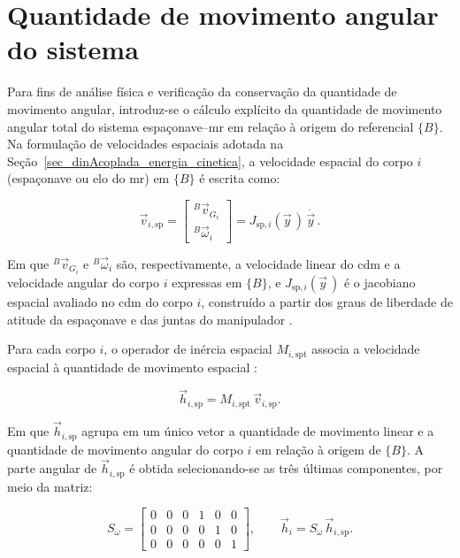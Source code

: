 \section{Quantidade de movimento angular do sistema}
\label{sec_dinAcoplada_quantidade_movimento_angular}

Para fins de análise física e verificação da conservação da quantidade de movimento angular,
introduz-se o cálculo explícito da quantidade de movimento angular total do sistema
espaçonave--\gls{mr} em relação à origem do referencial $\{B\}$.
Na formulação de velocidades espaciais adotada na Seção~\ref{sec_dinAcoplada_energia_cinetica},
a velocidade espacial do corpo $i$ (espaçonave ou elo do \gls{mr}) em $\{B\}$ é escrita como:

\begin{equation}
\vec v_{i,\text{sp}}
=
\begin{bmatrix}
{}^{B}\!\vec v_{G_i} \\[2pt]
{}^{B}\!\vec\omega_i
\end{bmatrix}
=
J_{\text{sp},i}(\vec y\,)\,\dot{\vec y\,}.
\label{eq_velocidade_espacial_corpo_i}
\end{equation}


Em que ${}^{B}\!\vec v_{G_i}$ e ${}^{B}\!\vec\omega_i$ são, respectivamente,
a velocidade linear do \gls{cdm} e a velocidade angular do corpo $i$
expressas em $\{B\}$, e $J_{\text{sp},i}(\vec y\,)$ é o jacobiano espacial
avaliado no \gls{cdm} do corpo $i$, construído a partir dos graus de
liberdade de atitude da espaçonave e das juntas do manipulador
\cite{featherstone2008}.

Para cada corpo $i$, o operador de inércia espacial
$M_{i,\text{spt}}$ associa a velocidade espacial à quantidade de movimento espacial
\cite{featherstone2008}:

\begin{equation}
\vec h_{i,\text{sp}}
=
M_{i,\text{spt}}\,\vec v_{i,\text{sp}}.
\label{eq_quantidade_movimento_espacial_corpo_i}
\end{equation}


Em que $\vec h_{i,\text{sp}}$ agrupa em um único vetor a quantidade de movimento linear e a quantidade de movimento angular do corpo $i$ em relação à origem de $\{B\}$.
A parte angular de $\vec h_{i,\text{sp}}$ é obtida selecionando-se as
três últimas componentes, por meio da matriz:

\begin{equation}
S_\omega
=
\begin{bmatrix}
0 & 0 & 0 & 1 & 0 & 0 \\
0 & 0 & 0 & 0 & 1 & 0 \\
0 & 0 & 0 & 0 & 0 & 1
\end{bmatrix},
\qquad
\vec h_i
=
S_\omega\,\vec h_{i,\text{sp}}.
\label{eq_selecao_parte_angular}
\end{equation}

